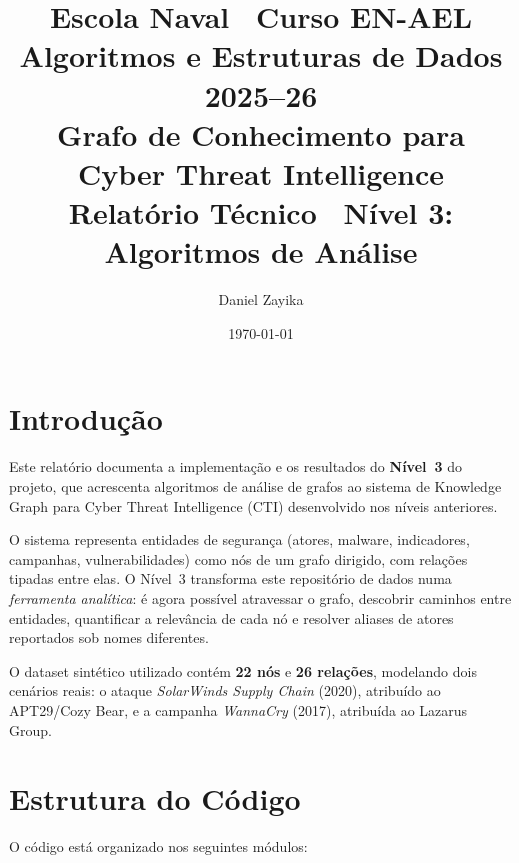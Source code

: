 \documentclass[12pt,a4paper]{article}
\title{%
  \vspace{-1cm}
  {\large Escola Naval \textemdash\ Curso EN-AEL}\\[0.4cm]
  {\large Algoritmos e Estruturas de Dados 2025--26}\\[0.8cm]
  {\LARGE\bfseries Grafo de Conhecimento para\\[0.2cm]
   Cyber Threat Intelligence}\\[0.4cm]
  {\large Relatório Técnico \textemdash\ Nível 3: Algoritmos de Análise}
}
\author{Daniel Zayika}
\date{\today}
\begin{document}
\maketitle
\thispagestyle{fancy}

\tableofcontents
\newpage

\section{Introdução}

Este relatório documenta a implementação e os resultados do \textbf{Nível~3} do projeto, que acrescenta algoritmos de análise de grafos ao sistema de Knowledge Graph para Cyber Threat Intelligence (CTI) desenvolvido nos níveis anteriores.

O sistema representa entidades de segurança (atores, malware, indicadores, campanhas, vulnerabilidades) como nós de um grafo dirigido, com relações tipadas entre elas. O Nível~3 transforma este repositório de dados numa \emph{ferramenta analítica}: é agora possível atravessar o grafo, descobrir caminhos entre entidades, quantificar a relevância de cada nó e resolver aliases de atores reportados sob nomes diferentes.

O dataset sintético utilizado contém \textbf{22 nós} e \textbf{26 relações}, modelando dois cenários reais: o ataque \emph{SolarWinds Supply Chain} (2020), atribuído ao APT29/Cozy Bear, e a campanha \emph{WannaCry} (2017), atribuída ao Lazarus Group.

\section{Estrutura do Código}

O código está organizado nos seguintes módulos:
\end{document}
